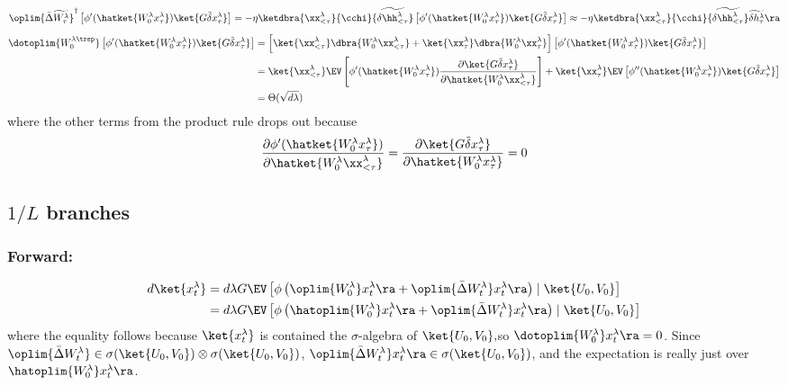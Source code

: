 \[
\oplim{\bar{\Delta}\widetilde{W_{\tau}^{\lambda}}}^{\dagger}\left[\phi'(\hatket{W_{0}^{\lambda}x_{\tau}^{\lambda}})\ket{G\tilde\delta x_{\tau}^{\lambda}}\right]=-\eta\ketdbra{\xx_{<\tau}^{\lambda}}{\cchi}{\widetilde{\delta\hh_{<\tau}^{\lambda}}}\left[\phi'(\hatket{W_{0}^{\lambda}x_{\tau}^{\lambda}})\ket{G\tilde\delta x_{\tau}^{\lambda}}\right]\approx-\eta\ketdbra{\xx_{<\tau}^{\lambda}}{\cchi}{\widetilde{\delta\hh_{<\tau}^{\lambda}}}\widetilde{\delta h_{\tau}^{\lambda}}\ra
\]
\begin{align*}
\dotoplim{W_{0}^{\lambda\trsp}}\left[\phi'(\hatket{W_{0}^{\lambda}x_{\tau}^{\lambda}})\ket{G\tilde\delta x_{\tau}^{\lambda}}\right] & =\left[\ket{\xx_{<\tau}^{\lambda}}\dbra{W_{0}^{\lambda}\xx_{<\tau}^{\lambda}}+\ket{\xx_{\tau}^{\lambda}}\dbra{W_{0}^{\lambda}\xx_{\tau}^{\lambda}}\right]\left[\phi'(\hatket{W_{0}^{\lambda}x_{\tau}^{\lambda}})\ket{G\tilde\delta x_{\tau}^{\lambda}}\right]\\
 & =\ket{\xx_{<\tau}^{\lambda}}\EV\left[\phi'(\hatket{W_{0}^{\lambda}x_{\tau}^{\lambda}})\frac{\partial\ket{G\tilde\delta x_{\tau}^{\lambda}}}{\partial\hatket{W_{0}^{\lambda}\xx_{<\tau}^{\lambda}}}\right]+\ket{\xx_{\tau}^{\lambda}}\EV\left[\phi''(\hatket{W_{0}^{\lambda}x_{\tau}^{\lambda}})\ket{G\tilde\delta x_{\tau}^{\lambda}}\right]\\
 & =\Theta(\sqrt{d\lambda})
\end{align*}
where the other terms from the product rule drops out because 
\[
\frac{\partial\phi'(\hatket{W_{0}^{\lambda}x_{\tau}^{\lambda}})}{\partial\hatket{W_{0}^{\lambda}\xx_{<\tau}^{\lambda}}}=\frac{\partial\ket{G\tilde\delta x_{\tau}^{\lambda}}}{\partial\hatket{W_{0}^{\lambda}x_{\tau}^{\lambda}}}=0
\]

\subsection{$1/L$ branches}\label{heuristics:inv-depth}

\subsubsection{Forward:}

\begin{align*}
d\ket{x_{t}^{\lambda}} & =d\lambda G\EV\left[\phi\left(\oplim{W_{0}^{\lambda}}x_{t}^{\lambda}\ra+\oplim{\bar{\Delta}W_{t}^{\lambda}}x_{t}^{\lambda}\ra\right)\mid\ket{U_{0},V_{0}}\right]\\
 & =d\lambda G\EV\left[\phi\left(\hatoplim{W_{0}^{\lambda}}x_{t}^{\lambda}\ra+\oplim{\bar{\Delta}W_{t}^{\lambda}}x_{t}^{\lambda}\ra\right)\mid\ket{U_{0},V_{0}}\right]
\end{align*}
where the equality follows because $\ket{x_{t}^{\lambda}}$ is contained
the $\sigma$-algebra of $\ket{U_{0},V_{0}},$so $\dotoplim{W_{0}^{\lambda}}x_{t}^{\lambda}\ra=0$.
Since $\oplim{\bar{\Delta}W_{t}^{\lambda}}\in\sigma(\ket{U_{0},V_{0}})\otimes\sigma(\ket{U_{0},V_{0}})$,
$\oplim{\bar{\Delta}W_{t}^{\lambda}}x_{t}^{\lambda}\ra\in\sigma(\ket{U_{0},V_{0}})$,
and the expectation is really just over $\hatoplim{W_{0}^{\lambda}}x_{t}^{\lambda}\ra$.

